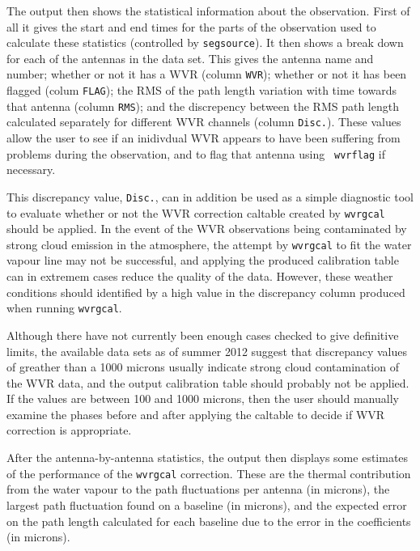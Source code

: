 The output then shows the statistical information about the
observation. First of all it gives the start and end times for the
parts of the observation used to calculate these statistics
(controlled by {\tt segsource}).  It then shows a break down for each
of the antennas in the data set. This gives the antenna name and
number; whether or not it has a WVR (column {\tt WVR}); whether or not
it has been flagged (colum {\tt FLAG}); the RMS of the path length
variation with time towards that antenna (column {\tt RMS}); and the
discrepency between the RMS path length calculated separately for
different WVR channels (column {\tt Disc.}). These values allow the
user to see if an inidivdual WVR appears to have been suffering from
problems during the observation, and to flag that antenna using {\tt
  wvrflag} if necessary.

This discrepancy value, {\tt Disc.}, can in addition be used as a simple
diagnostic tool to evaluate whether or not the WVR correction caltable
created by {\tt wvrgcal} should be applied. In the event of the WVR
observations being contaminated by strong cloud emission in the
atmosphere, the attempt by {\tt wvrgcal} to fit the water vapour line
may not be successful, and applying the produced calibration table can
in extremem cases reduce the quality of the data. However, these
weather conditions should identified by a high value in the
discrepancy column produced when running {\tt wvrgcal}.

Although there have not currently been enough cases checked to give
definitive limits, the available data sets as of summer 2012 suggest
that discrepancy values of greather than a 1000 microns usually indicate
strong cloud contamination of the WVR data, and the output calibration
table should probably not be applied. If the values are between 100
and 1000 microns, then the user should manually examine the
phases before and after applying the caltable to decide if WVR
correction is appropriate.

After the antenna-by-antenna statistics, the output then displays some
estimates of the performance of the {\tt wvrgcal} correction. 
These are the thermal contribution from the water vapour to the path
fluctuations per antenna (in microns), the largest path fluctuation
found on a baseline (in microns), and the expected error on the path
length calculated for each baseline due to the error in the
coefficients (in microns). 



